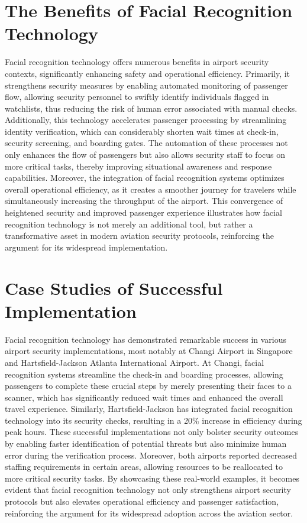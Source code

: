\documentclass{article}%
\begin{document}
\section*{The Benefits of Facial Recognition Technology}%
\label{sec:TheBenefitsofFacialRecognitionTechnology}%
Facial recognition technology offers numerous benefits in airport security contexts, significantly enhancing safety and operational efficiency. Primarily, it strengthens security measures by enabling automated monitoring of passenger flow, allowing security personnel to swiftly identify individuals flagged in watchlists, thus reducing the risk of human error associated with manual checks. Additionally, this technology accelerates passenger processing by streamlining identity verification, which can considerably shorten wait times at check{-}in, security screening, and boarding gates. The automation of these processes not only enhances the flow of passengers but also allows security staff to focus on more critical tasks, thereby improving situational awareness and response capabilities. Moreover, the integration of facial recognition systems optimizes overall operational efficiency, as it creates a smoother journey for travelers while simultaneously increasing the throughput of the airport. This convergence of heightened security and improved passenger experience illustrates how facial recognition technology is not merely an additional tool, but rather a transformative asset in modern aviation security protocols, reinforcing the argument for its widespread implementation.

%
\section*{Case Studies of Successful Implementation}%
\label{sec:CaseStudiesofSuccessfulImplementation}%
Facial recognition technology has demonstrated remarkable success in various airport security implementations, most notably at Changi Airport in Singapore and Hartsfield{-}Jackson Atlanta International Airport. At Changi, facial recognition systems streamline the check{-}in and boarding processes, allowing passengers to complete these crucial steps by merely presenting their faces to a scanner, which has significantly reduced wait times and enhanced the overall travel experience. Similarly, Hartsfield{-}Jackson has integrated facial recognition technology into its security checks, resulting in a 20\% increase in efficiency during peak hours. These successful implementations not only bolster security outcomes by enabling faster identification of potential threats but also minimize human error during the verification process. Moreover, both airports reported decreased staffing requirements in certain areas, allowing resources to be reallocated to more critical security tasks. By showcasing these real{-}world examples, it becomes evident that facial recognition technology not only strengthens airport security protocols but also elevates operational efficiency and passenger satisfaction, reinforcing the argument for its widespread adoption across the aviation sector.
\end{document}
